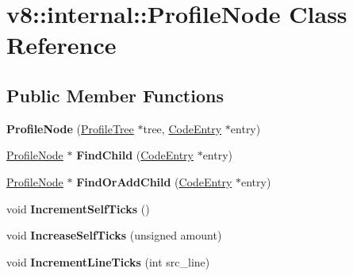 \hypertarget{classv8_1_1internal_1_1_profile_node}{}\section{v8\+:\+:internal\+:\+:Profile\+Node Class Reference}
\label{classv8_1_1internal_1_1_profile_node}
\subsection*{Public Member Functions}
\begin{DoxyCompactItemize}
\item 
{\bfseries Profile\+Node} (\hyperlink{classv8_1_1internal_1_1_profile_tree}{Profile\+Tree} $\ast$tree, \hyperlink{classv8_1_1internal_1_1_code_entry}{Code\+Entry} $\ast$entry)\hypertarget{classv8_1_1internal_1_1_profile_node_afeb26f68b37dac7e9d3102463a19b850}{}\label{classv8_1_1internal_1_1_profile_node_afeb26f68b37dac7e9d3102463a19b850}

\item 
\hyperlink{classv8_1_1internal_1_1_profile_node}{Profile\+Node} $\ast$ {\bfseries Find\+Child} (\hyperlink{classv8_1_1internal_1_1_code_entry}{Code\+Entry} $\ast$entry)\hypertarget{classv8_1_1internal_1_1_profile_node_ac96d366da81d11a5b0df39395107c94c}{}\label{classv8_1_1internal_1_1_profile_node_ac96d366da81d11a5b0df39395107c94c}

\item 
\hyperlink{classv8_1_1internal_1_1_profile_node}{Profile\+Node} $\ast$ {\bfseries Find\+Or\+Add\+Child} (\hyperlink{classv8_1_1internal_1_1_code_entry}{Code\+Entry} $\ast$entry)\hypertarget{classv8_1_1internal_1_1_profile_node_ad497489ded1efb610de028ba9c411ea9}{}\label{classv8_1_1internal_1_1_profile_node_ad497489ded1efb610de028ba9c411ea9}

\item 
void {\bfseries Increment\+Self\+Ticks} ()\hypertarget{classv8_1_1internal_1_1_profile_node_a651b8b8c09b8a8dda1acb22d41bebd09}{}\label{classv8_1_1internal_1_1_profile_node_a651b8b8c09b8a8dda1acb22d41bebd09}

\item 
void {\bfseries Increase\+Self\+Ticks} (unsigned amount)\hypertarget{classv8_1_1internal_1_1_profile_node_af4feb4a8fec76e8bc6d0426ae261bb0c}{}\label{classv8_1_1internal_1_1_profile_node_af4feb4a8fec76e8bc6d0426ae261bb0c}

\item 
void {\bfseries Increment\+Line\+Ticks} (int src\+\_\+line)\hypertarget{classv8_1_1internal_1_1_profile_node_a778b6f214de8367560f62a963fad3d37}{}\label{classv8_1_1internal_1_1_profile_node_a778b6f214de8367560f62a963fad3d37}


\end{DoxyCompactItemize}
